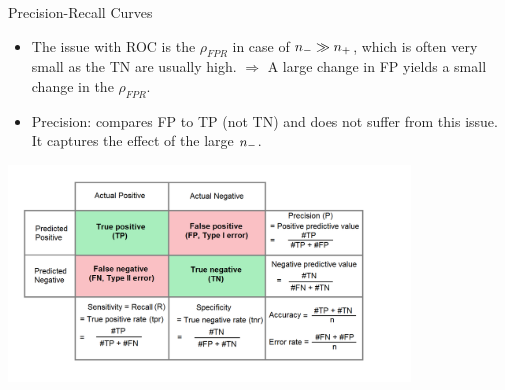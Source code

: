 \begin{vbframe}{Precision-Recall Curves}


\framebreak

\begin{itemize}
  \item The issue with ROC is the $\rho_{FPR}$ in case of $n_{-} \gg n_{+}$, which is often 
  very small as the TN are usually high. \newline
  $\Rightarrow$ A large change in FP yields a small change in the $\rho_{FPR}$.
  \item Precision: compares FP to TP (not TN) and does not suffer from this 
  issue. It captures the effect of the large $n_{-}$.
\end{itemize}

\begin{center}
  \includegraphics[width=0.8\textwidth]{figure_man/roc-confusion_matrix.png}
\end{center}

\framebreak

\begin{footnotesize}


\end{footnotesize}
\end{vbframe}
